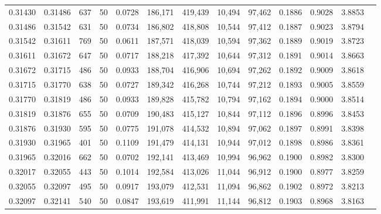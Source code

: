 \begin{tabular}{rrrrrrrrrrrrr}
0.31430 & 0.31486 &   637 &  50 &                                     0.0728 & 186,171 & 419,439 &  10,494 &  97,462 & 0.1886 & 0.9028 & 3.8853 \\
0.31486 & 0.31542 &   631 &  50 &                                     0.0734 & 186,802 & 418,808 &  10,544 &  97,412 & 0.1887 & 0.9023 & 3.8794 \\
0.31542 & 0.31611 &   769 &  50 &                                     0.0611 & 187,571 & 418,039 &  10,594 &  97,362 & 0.1889 & 0.9019 & 3.8723 \\
0.31611 & 0.31672 &   647 &  50 &                                     0.0717 & 188,218 & 417,392 &  10,644 &  97,312 & 0.1891 & 0.9014 & 3.8663 \\
0.31672 & 0.31715 &   486 &  50 &                                     0.0933 & 188,704 & 416,906 &  10,694 &  97,262 & 0.1892 & 0.9009 & 3.8618 \\
0.31715 & 0.31770 &   638 &  50 &                                     0.0727 & 189,342 & 416,268 &  10,744 &  97,212 & 0.1893 & 0.9005 & 3.8559 \\
0.31770 & 0.31819 &   486 &  50 &                                     0.0933 & 189,828 & 415,782 &  10,794 &  97,162 & 0.1894 & 0.9000 & 3.8514 \\
0.31819 & 0.31876 &   655 &  50 &                                     0.0709 & 190,483 & 415,127 &  10,844 &  97,112 & 0.1896 & 0.8996 & 3.8453 \\
0.31876 & 0.31930 &   595 &  50 &                                     0.0775 & 191,078 & 414,532 &  10,894 &  97,062 & 0.1897 & 0.8991 & 3.8398 \\
0.31930 & 0.31965 &   401 &  50 &                                     0.1109 & 191,479 & 414,131 &  10,944 &  97,012 & 0.1898 & 0.8986 & 3.8361 \\
0.31965 & 0.32016 &   662 &  50 &                                     0.0702 & 192,141 & 413,469 &  10,994 &  96,962 & 0.1900 & 0.8982 & 3.8300 \\
0.32017 & 0.32055 &   443 &  50 &                                     0.1014 & 192,584 & 413,026 &  11,044 &  96,912 & 0.1900 & 0.8977 & 3.8259 \\
0.32055 & 0.32097 &   495 &  50 &                                     0.0917 & 193,079 & 412,531 &  11,094 &  96,862 & 0.1902 & 0.8972 & 3.8213 \\
0.32097 & 0.32141 &   540 &  50 &                                     0.0847 & 193,619 & 411,991 &  11,144 &  96,812 & 0.1903 & 0.8968 & 3.8163 \\

\end{tabular}
